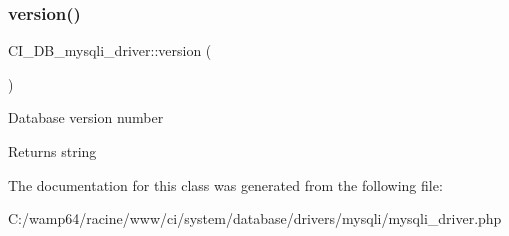 \subsubsection{\texorpdfstring{version()}{version()}}
{\footnotesize\ttfamily C\+I\+\_\+\+D\+B\+\_\+mysqli\+\_\+driver\+::version (\begin{DoxyParamCaption}{ }\end{DoxyParamCaption})}

Database version number

\begin{DoxyReturn}{Returns}
string 
\end{DoxyReturn}


The documentation for this class was generated from the following file\+:\begin{DoxyCompactItemize}
\item 
C\+:/wamp64/racine/www/ci/system/database/drivers/mysqli/mysqli\+\_\+driver.\+php\end{DoxyCompactItemize}
